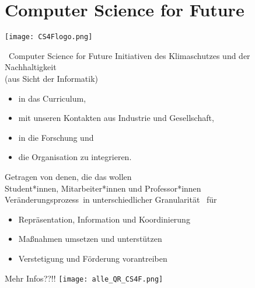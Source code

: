 

\section{Computer Science for Future}
\begin{frame}{}
\hspace*{\fill}
\texttt{[image: CS4Flogo.png]}

\hspace*{\fill}
\end{frame}

\begin{frame}{\CSfF \ Computer Science for Future}
Initiativen  des Klimaschutzes und der Nachhaltigkeit  \\\hspace*{\fill}           (aus Sicht der Informatik)

\begin{itemize}
	\item in das Curriculum,
	\item mit unseren Kontakten aus Industrie und Gesellschaft,
	\item in die Forschung und
	\item die Organisation zu integrieren.
\end{itemize}
\vfill


Getragen von denen, die das wollen\\
Student*innen, Mitarbeiter*innen und Professor*innen\\ \vfill
Veränderungsprozess in unterschiedlicher Granularität \CSfF \ für
\begin{itemize}
	\item Repräsentation, Information und Koordinierung
	\item Maßnahmen umsetzen und unterstützen
	\item Verstetigung und Förderung vorantreiben
	\end{itemize}
\end{frame}

\begin{frame}{Mehr Infos??!!}
\texttt{[image: alle\_QR\_CS4F.png]}

\end{frame}
